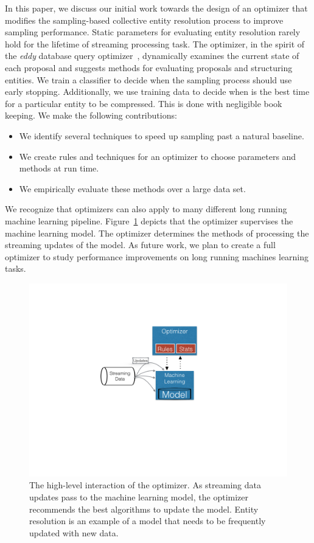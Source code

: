 In this paper, we discuss our initial work towards the design of an optimizer that modifies the
sampling-based collective entity resolution process to improve sampling performance.
Static parameters for evaluating entity resolution rarely hold for the lifetime of streaming processing task.
The optimizer, in the spirit of the \textit{eddy} database query optimizer~\cite{avnur2000eddies}, dynamically examines the
current state of each proposal and suggests methods for evaluating proposals and structuring entities.
We train a classifier to decide when the sampling process should use early stopping.
Additionally, we use training data to decide when is the best time for a particular entity to be compressed.
This is done with negligible book keeping.
We make the following contributions:
\begin{itemize}
\item We identify several techniques to speed up sampling past a natural baseline.
\item We create rules and techniques for an optimizer to choose parameters and methods at run time.
\item We empirically evaluate these methods over a large data set.
\end{itemize}
We recognize that optimizers can also apply to many different long running machine learning pipeline.
Figure~\ref{fig:optimizer-arch} depicts that the optimizer supervises the machine learning model.
The optimizer determines the methods of processing the streaming updates of the model. 
As future work, we plan to create a full optimizer to study performance improvements on long running machines learning tasks.


\begin{figure}
\centering
\includegraphics[width=\columnwidth, clip=true, trim= 25em 30em 30em 17em]{media/optimizer/optimizer.png}
\caption{The high-level interaction of the optimizer. As streaming data updates pass to the machine learning model, the optimizer recommends the best algorithms to update the model. Entity resolution is an example of a model that needs to be frequently updated with new data.}
\label{fig:optimizer-arch}
\end{figure}


